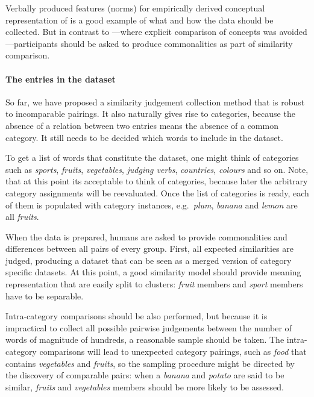 \documentclass[11pt]{article}
\begin{document}
Verbally produced features (norms) for empirically derived conceptual representation of  is a good example of what and how the data should be collected. But in contrast to ---where explicit comparison of concepts was avoided---participants should be asked to produce commonalities as part of similarity comparison.

\paragraph{The entries in the dataset}

So far, we have proposed a similarity judgement collection method that is robust to incomparable pairings. It also naturally gives rise to categories, because the absence of a relation between two entries means the absence of a common category. It still needs to be decided which words to include in the dataset.

To get a list of words that constitute the dataset, one might think of categories such as \textit{sports}, \textit{fruits}, \textit{vegetables}, \textit{judging verbs}, \textit{countries}, \textit{colours} and so on. Note, that at this point its acceptable to think of categories, because later the arbitrary category assignments will be reevaluated. Once the list of categories is ready, each of them is populated with category instances, e.g.~\textit{plum}, \textit{banana} and \textit{lemon} are all \textit{fruits}.

When the data is prepared, humans are asked to provide commonalities and differences between all pairs of every group. First, all expected similarities are judged, producing a dataset that can be seen as a merged version of category specific datasets. At this point, a good similarity model should provide meaning representation that are easily split to clusters: \textit{fruit} members and \textit{sport} members have to be separable.

Intra-category comparisons should be also performed, but because it is impractical to collect all possible pairwise judgements between the number of words of magnitude of hundreds, a reasonable sample should be taken. The intra-category comparisons will lead to unexpected category pairings, such as \textit{food} that contains \textit{vegetables} and \textit{fruits}, so the sampling procedure might be directed by the discovery of comparable pairs: when a \textit{banana} and \textit{potato} are said to be similar, \textit{fruits} and \textit{vegetables} members should be more likely to be assessed.
\end{document}
